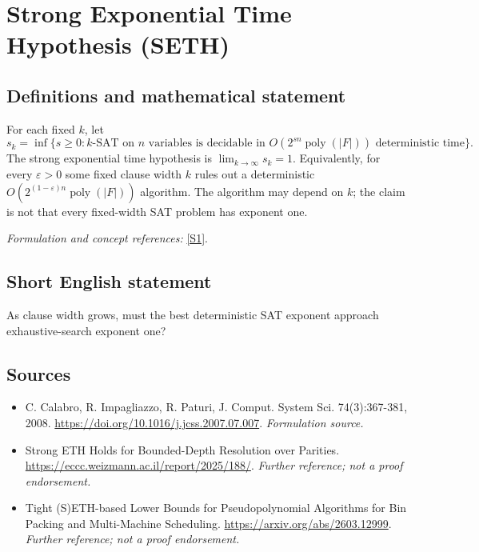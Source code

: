 \documentclass[11pt]{article}
\begin{document}
\section*{\texorpdfstring{Strong Exponential Time Hypothesis (SETH)}{Strong Exponential Time Hypothesis (SETH)}}\label{statement}
\subsection{Definitions and mathematical statement}
For each fixed $k$, let
\[
 s_k=\inf\{s\ge0:k\text{-SAT on }n\text{ variables is decidable in }
 O(2^{sn}\operatorname{poly}(|F|))\text{ deterministic time}\}.
\]
The strong exponential time hypothesis is $\lim_{k\to\infty}s_k=1$. Equivalently, for every $\varepsilon>0$ some fixed clause width $k$ rules out a deterministic $O(2^{(1-\varepsilon)n}\operatorname{poly}(|F|))$ algorithm. The algorithm may depend on $k$; the claim is not that every fixed-width SAT problem has exponent one.
\par\smallskip\textit{Formulation and concept references:} \href{https://doi.org/10.1016/j.jcss.2007.07.007}{[S1]}.

\subsection{Short English statement}
As clause width grows, must the best deterministic SAT exponent approach exhaustive-search exponent one?
\subsection{Sources}
\begin{itemize}
\item[S1]C. Calabro, R. Impagliazzo, R. Paturi, J. Comput. System Sci. 74(3):367-381, 2008.
\url{https://doi.org/10.1016/j.jcss.2007.07.007}.
\textit{Formulation source.}
\item[S2]Strong ETH Holds for Bounded-Depth Resolution over Parities.
\url{https://eccc.weizmann.ac.il/report/2025/188/}.
\textit{Further reference; not a proof endorsement.}
\item[S3]Tight (S)ETH-based Lower Bounds for Pseudopolynomial Algorithms for Bin Packing and Multi-Machine Scheduling.
\url{https://arxiv.org/abs/2603.12999}.
\textit{Further reference; not a proof endorsement.}
\end{itemize}
\end{document}
